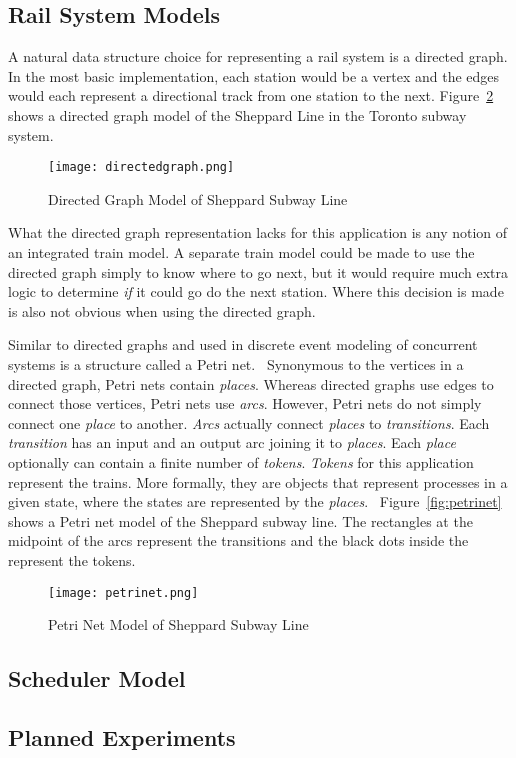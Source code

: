 \subsection{Rail System Models}
A natural data structure choice for representing a rail system is a directed graph.  In the most basic implementation, each station would be a vertex and the edges would each represent a directional track from one station to the next. Figure~\ref{fig:directedgraph} shows a directed graph model of the Sheppard Line in the Toronto subway system.
\begin{figure}[htb]
	\centering
	\texttt{[image: directedgraph.png]}
	\caption{Directed Graph Model of Sheppard Subway Line}
	\label{fig:directedgraph}
\end{figure}
What the directed graph representation lacks for this application is any notion of an integrated train model. A separate train model could be made to use the directed graph simply to know where to go next, but it would require much extra logic to determine \textit{if} it could go do the next station.  Where this decision is made is also not obvious when using the directed graph.

Similar to directed graphs and used in discrete event modeling of concurrent systems is a structure called a Petri net.~\cite{Petri62}  Synonymous to the vertices in a directed graph, Petri nets contain \textit{places}.  Whereas directed graphs use edges to connect those vertices, Petri nets use \textit{arcs}. However, Petri nets do not simply connect one \textit{place} to another.  \textit{Arcs} actually connect \textit{places} to \textit{transitions}. Each \textit{transition} has an input and an output arc joining it to \textit{places}.  Each \textit{place} optionally can contain a finite number of \textit{tokens}.  \textit{Tokens} for this application represent the trains.  More formally, they are objects that represent processes in a given state, where the states are represented by the \textit{places}.~\cite{Kristoffersen2003}  Figure~\ref{fig:petrinet} shows a Petri net model of the Sheppard subway line. The rectangles at the midpoint of the arcs represent the transitions and the black dots inside the represent the tokens.
\begin{figure}[htb]
	\centering
	\texttt{[image: petrinet.png]}
	\caption{Petri Net Model of Sheppard Subway Line}
	\label{fig:directedgraph}
\end{figure}

\subsection{Scheduler Model}

\subsection{Planned Experiments}


